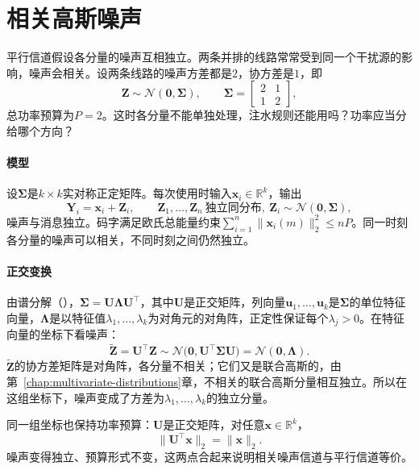 \section{相关高斯噪声}
\label{sec:gcc-correlated}

平行信道假设各分量的噪声互相独立。两条并排的线路常常受到同一个干扰源的影响，噪声会相关。设两条线路的噪声方差都是$2$，协方差是$1$，即
\[
 \bm{Z}\sim\mathcal{N}(\bm{0},\bm{\Sigma}),\qquad \bm{\Sigma}=\begin{bmatrix}2&1\\1&2\end{bmatrix},
\]
总功率预算为$P=2$。这时各分量不能单独处理，注水规则还能用吗？功率应当分给哪个方向？

\paragraph{模型}
设$\bm{\Sigma}$是$k\times k$实对称正定矩阵。每次使用时输入$\bm{x}_i\in\mathbb{R}^k$，输出
\begin{equation}
 \bm{Y}_i=\bm{x}_i+\bm{Z}_i,\qquad \bm{Z}_1,\dots,\bm{Z}_n\ \text{独立同分布},\ \bm{Z}_i\sim\mathcal{N}(\bm{0},\bm{\Sigma}),
 \label{eq:gcc-correlated}
\end{equation}
噪声与消息独立。码字满足欧氏总能量约束$\sum_{i=1}^{n}\lVert\bm{x}_i(m)\rVert_2^2\leq nP$。同一时刻各分量的噪声可以相关，不同时刻之间仍然独立。

\paragraph{正交变换}
由谱分解（），$\bm{\Sigma}=\bm{U}\bm{\Lambda}\bm{U}^{\top}$，其中$\bm{U}$是正交矩阵，列向量$\bm{u}_1,\dots,\bm{u}_k$是$\bm{\Sigma}$的单位特征向量，$\bm{\Lambda}$是以特征值$\lambda_1,\dots,\lambda_k$为对角元的对角阵，正定性保证每个$\lambda_j>0$。在特征向量的坐标下看噪声：
\[
 \tilde{\bm{Z}}=\bm{U}^{\top}\bm{Z}\sim\mathcal{N}\bigl(\bm{0},\bm{U}^{\top}\bm{\Sigma}\bm{U}\bigr)=\mathcal{N}(\bm{0},\bm{\Lambda}) .
\]
$\tilde{\bm{Z}}$的协方差矩阵是对角阵，各分量不相关；它们又是联合高斯的，由第~\ref{chap:multivariate-distributions}章，不相关的联合高斯分量相互独立。所以在这组坐标下，噪声变成了方差为$\lambda_1,\dots,\lambda_k$的独立分量。

同一组坐标也保持功率预算：$\bm{U}$是正交矩阵，对任意$\bm{x}\in\mathbb{R}^k$，
\[
 \lVert\bm{U}^{\top}\bm{x}\rVert_2=\lVert\bm{x}\rVert_2 .
\]
噪声变得独立、预算形式不变，这两点合起来说明相关噪声信道与平行信道等价。

